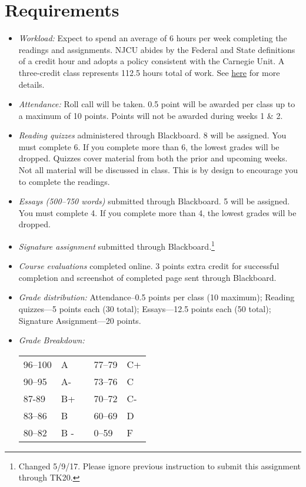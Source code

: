 \documentclass[article,oneside]{memoir}
\begin{document}
\section{Requirements}



\begin{itemize}
\item \textit{Workload:} Expect to spend an average of 6 hours per week completing the readings and assignments. NJCU abides by the Federal and State definitions of a credit hour and adopts a policy consistent with the Carnegie Unit. A three-credit class represents 112.5 hours total of work. See \href{http://scoconno.github.io/Teaching/Credit.pdf}{here} for more details.

\item \textit{Attendance:} Roll call will be taken. 0.5 point will be awarded per class up to a maximum of 10 points. Points will not be awarded during weeks 1 \& 2. 

\item \textit{Reading quizzes} administered through Blackboard. 8  will be assigned. You must complete 6. If you complete more than 6, the lowest grades will be dropped. Quizzes cover material from both the prior and upcoming weeks. Not all material will be discussed in class. This is by design to encourage you to complete the readings. 


\item \textit{Essays (500--750 words)} submitted through Blackboard.  5 will be assigned. You must complete 4. If you complete more than 4, the lowest grades will be dropped. 

\item \textit{Signature assignment} submitted through Blackboard.\footnote{Changed 5/9/17. Please ignore previous instruction to submit this assignment through TK20.}

\item \textit{Course evaluations} completed online. 3 points extra credit for successful completion and screenshot of completed page sent through Blackboard. 
  
\item \textit{Grade distribution:} Attendance--0.5 points per class (10 maximum); Reading quizzes---5 points each (30 total);  Essays---12.5 points each (50 total); Signature Assignment---20 points.


\item \textit{Grade Breakdown:}

 \begin{tabular}{ | l | l | p{2cm} | l | l | }
    \hline 
96--100 & A  & &  77--79 &  C+ \\  
90--95 & A- & &  73--76 & C \\
87-89 & B+ &  &  70--72 & C- \\ 
83--86 & B  & &  60--69 & D\\
80--82 & B - & & 0--59 & F\\ \hline
    \end{tabular}


\end{itemize}
\end{document}
